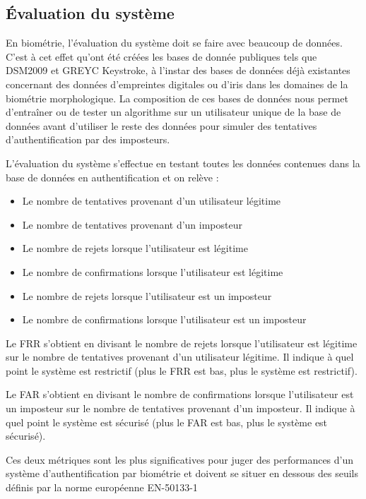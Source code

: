 \subsection{Évaluation du système}

En biométrie, l'évaluation du système doit se faire avec beaucoup de données. C'est à cet effet qu'ont été créées les bases de donnée publiques tels que DSM2009\cite{killourhy2009} et GREYC Keystroke\cite{giotGREYC}, à l'instar des bases de données déjà existantes concernant des données d'empreintes digitales ou d'iris dans les domaines de la biométrie morphologique. La composition de ces bases de données nous permet d'entraîner ou de tester un algorithme sur un utilisateur unique de la base de données avant d'utiliser le reste des données pour simuler des tentatives d'authentification par des imposteurs.

L'évaluation du système s'effectue en testant toutes les données contenues dans la base de données en authentification et on relève :

\begin{itemize}
  \item Le nombre de tentatives provenant d'un utilisateur légitime
  \item Le nombre de tentatives provenant d'un imposteur
  \item Le nombre de rejets lorsque l'utilisateur est légitime
  \item Le nombre de confirmations lorsque l'utilisateur est légitime
  \item Le nombre de rejets lorsque l'utilisateur est un imposteur
  \item Le nombre de confirmations lorsque l'utilisateur est un imposteur
\end{itemize}

Le FRR s'obtient en divisant le nombre de rejets lorsque l'utilisateur est légitime sur le nombre de tentatives provenant d'un utilisateur légitime. Il indique à quel point le système est restrictif (plus le FRR est bas, plus le système est restrictif).

Le FAR s'obtient en divisant le nombre de confirmations lorsque l'utilisateur est un imposteur sur le nombre de tentatives provenant d'un imposteur. Il indique à quel point le système est sécurisé (plus le FAR est bas, plus le système est sécurisé).

Ces deux métriques sont les plus significatives pour juger des performances d'un système d'authentification par biométrie et doivent se situer en dessous des seuils définis par la norme européenne EN-50133-1
